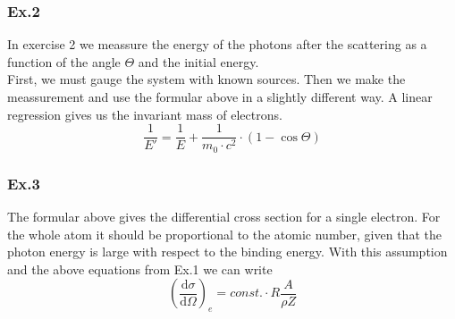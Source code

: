 \subsubsection{Ex.2}
In exercise 2 we meassure the energy of the photons after the scattering as a function of the angle $\Theta$ and the initial energy. \\
First, we must gauge the system with known sources. Then we make the meassurement and use the formular above in a slightly different way. A linear regression gives us the invariant mass of electrons.
$$\frac{1}{E'} = \frac{1}{E} + \frac{1}{m_0 \cdot c^{2}} \cdot (1 - \cos \Theta) $$

\subsubsection{Ex.3}
The formular above gives the differential cross section for a single electron. For the whole atom it should be proportional to the atomic number, given that the photon energy is large with respect to the binding energy. With this assumption and the above equations from Ex.1 we can write
$$(\frac{\mathrm{d}\sigma}{\mathrm{d}\Omega})_e = const. \cdot R \frac{A}{\rho Z} $$